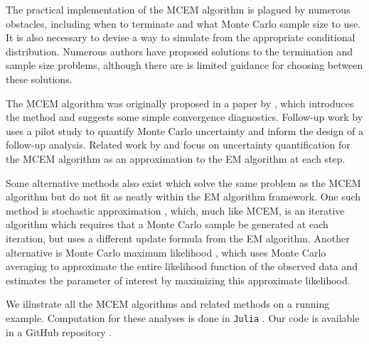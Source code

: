 \documentclass[11pt, oneside]{article}   	%
\begin{document}
The practical implementation of the MCEM algorithm is plagued by numerous obstacles, including when to terminate and what Monte Carlo sample size to use. It is also necessary to devise a way to simulate from the appropriate conditional distribution. Numerous authors have proposed solutions to the termination and sample size problems, although there are is limited guidance for choosing between these solutions.


The MCEM algorithm was originally proposed in a paper by \citet{Wei90}, which introduces the method and suggests some simple convergence diagnostics. Follow-up work by \citet{Cha95} uses a pilot study to quantify Monte Carlo uncertainty and inform the design of a follow-up analysis. Related work by \citet{Boo99} and \citet{Caf05} focus on uncertainty quantification for the MCEM algorithm as an approximation to the EM algorithm at each step.

Some alternative methods also exist which solve the same problem as the MCEM algorithm but do not fit as neatly within the EM algorithm framework. One such method is stochastic approximation \citep{Gu98I,Del99,Rob51}, which, much like MCEM, is an iterative algorithm which requires that a Monte Carlo sample be generated at each iteration, but uses a different update formula from the EM algorithm. Another alternative is Monte Carlo maximum likelihood \citep{Gey91}, which uses Monte Carlo averaging to approximate the entire likelihood function of the observed data and estimates the parameter of interest by maximizing this approximate likelihood.

We illustrate all the MCEM algorithms and related methods on a running example. Computation for these analyses is done in \texttt{Julia} \citep{Bez17}. Our code is available in a GitHub repository \citep{Rut23I}.
\end{document}
